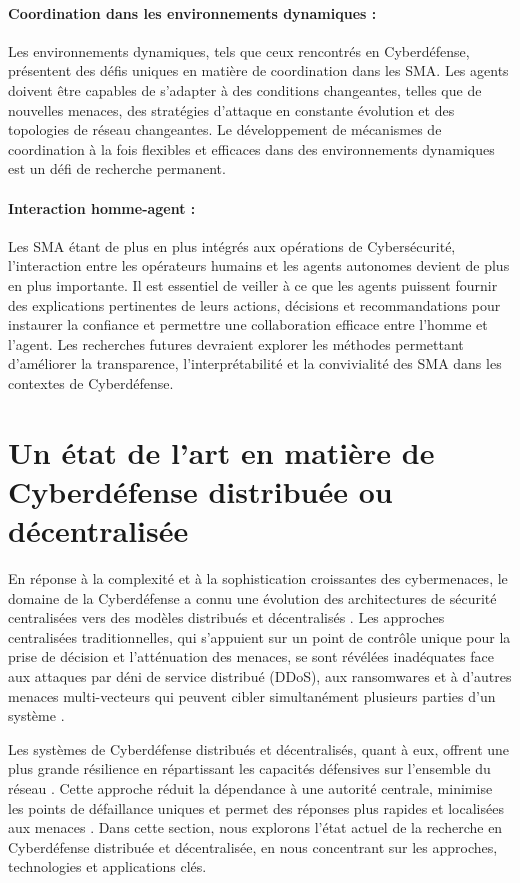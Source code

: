 \paragraph{Coordination dans les environnements dynamiques :}
Les environnements dynamiques, tels que ceux rencontrés en Cyberdéfense, présentent des défis uniques en matière de coordination dans les SMA. Les agents doivent être capables de s'adapter à des conditions changeantes, telles que de nouvelles menaces, des stratégies d'attaque en constante évolution et des topologies de réseau changeantes. Le développement de mécanismes de coordination à la fois flexibles et efficaces dans des environnements dynamiques est un défi de recherche permanent.

\paragraph{Interaction homme-agent :}
Les SMA étant de plus en plus intégrés aux opérations de Cybersécurité, l'interaction entre les opérateurs humains et les agents autonomes devient de plus en plus importante. Il est essentiel de veiller à ce que les agents puissent fournir des explications pertinentes de leurs actions, décisions et recommandations pour instaurer la confiance et permettre une collaboration efficace entre l'homme et l'agent. Les recherches futures devraient explorer les méthodes permettant d'améliorer la transparence, l'interprétabilité et la convivialité des SMA dans les contextes de Cyberdéfense.



\section{Un état de l'art en matière de Cyberdéfense distribuée ou décentralisée}

En réponse à la complexité et à la sophistication croissantes des cybermenaces, le domaine de la Cyberdéfense a connu une évolution des architectures de sécurité centralisées vers des modèles distribués et décentralisés \cite{Chen2021, Misra2023}. Les approches centralisées traditionnelles, qui s'appuient sur un point de contrôle unique pour la prise de décision et l'atténuation des menaces, se sont révélées inadéquates face aux attaques par déni de service distribué (DDoS), aux ransomwares et à d'autres menaces multi-vecteurs qui peuvent cibler simultanément plusieurs parties d'un système \cite{Munsing2018}.

Les systèmes de Cyberdéfense distribués et décentralisés, quant à eux, offrent une plus grande résilience en répartissant les capacités défensives sur l'ensemble du réseau \cite{Oliynykov2022}. Cette approche réduit la dépendance à une autorité centrale, minimise les points de défaillance uniques et permet des réponses plus rapides et localisées aux menaces \cite{Kott2021}. Dans cette section, nous explorons l'état actuel de la recherche en Cyberdéfense distribuée et décentralisée, en nous concentrant sur les approches, technologies et applications clés.


